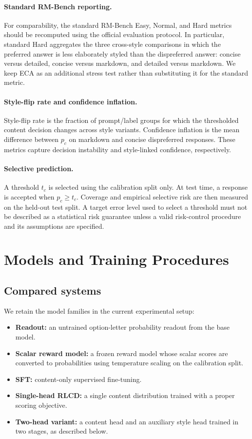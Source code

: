 \documentclass[letterpaper]{article} %
\begin{document}
\paragraph{Standard RM-Bench reporting.}
For comparability, the standard RM-Bench Easy, Normal, and Hard metrics should be recomputed using the official evaluation protocol. In particular, standard Hard aggregates the three cross-style comparisons in which the preferred answer is less elaborately styled than the dispreferred answer: concise versus detailed, concise versus markdown, and detailed versus markdown. We keep ECA as an additional stress test rather than substituting it for the standard metric.

\paragraph{Style-flip rate and confidence inflation.}
Style-flip rate is the fraction of prompt/label groups for which the thresholded content decision changes across style variants. Confidence inflation is the mean difference between $p_c$ on markdown and concise dispreferred responses. These metrics capture decision instability and style-linked confidence, respectively.

\paragraph{Selective prediction.}
A threshold $t_c$ is selected using the calibration split only. At test time, a response is accepted when $p_c\geq t_c$. Coverage and empirical selective risk are then measured on the held-out test split. A target error level used to select a threshold must not be described as a statistical risk guarantee unless a valid risk-control procedure and its assumptions are specified.

\section{Models and Training Procedures}

\subsection{Compared systems}

We retain the model families in the current experimental setup:
\begin{itemize}
    \item \textbf{Readout:} an untrained option-letter probability readout from the base model.
    \item \textbf{Scalar reward model:} a frozen reward model whose scalar scores are converted to probabilities using temperature scaling on the calibration split.
    \item \textbf{SFT:} content-only supervised fine-tuning.
    \item \textbf{Single-head RLCD:} a single content distribution trained with a proper scoring objective.
    \item \textbf{Two-head variant:} a content head and an auxiliary style head trained in two stages, as described below.
\end{itemize}
\end{document}
